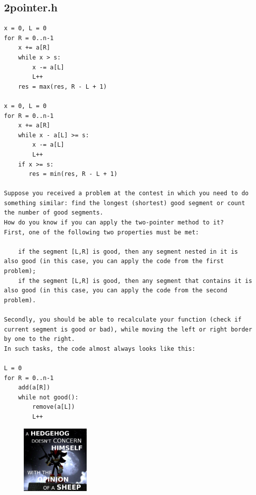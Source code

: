 \documentclass[11pt, a4paper, twoside]{article}
\begin{document}
\subsection{2pointer.h}
\begin{verbatim}
x = 0, L = 0 
for R = 0..n-1
    x += a[R]
    while x > s:
        x -= a[L]
        L++
    res = max(res, R - L + 1)

x = 0, L = 0
for R = 0..n-1
    x += a[R]
    while x - a[L] >= s:
        x -= a[L]
        L++
    if x >= s:
       res = min(res, R - L + 1)

Suppose you received a problem at the contest in which you need to do something similar: find the longest (shortest) good segment or count the number of good segments.
How do you know if you can apply the two-pointer method to it?
First, one of the following two properties must be met:

    if the segment [L,R] is good, then any segment nested in it is also good (in this case, you can apply the code from the first problem);
    if the segment [L,R] is good, then any segment that contains it is also good (in this case, you can apply the code from the second problem). 

Secondly, you should be able to recalculate your function (check if current segment is good or bad), while moving the left or right border by one to the right.
In such tasks, the code almost always looks like this:

L = 0
for R = 0..n-1
    add(a[R])
    while not good():
        remove(a[L])
        L++
\end{verbatim}

\begin{figure}[h!]
    \centering
    \includegraphics[width=0.3\textwidth]{Imagens/HEDSIGMA.jpg}
\end{figure}
\end{document}
